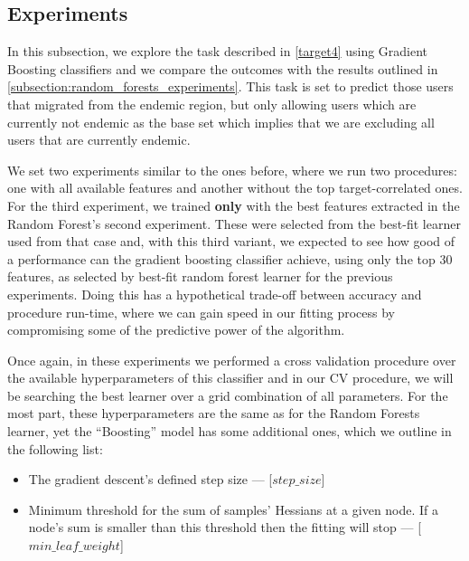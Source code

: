 \subsection{Experiments}\label{subsection:boosting_experiments}


In this subsection, we explore the task described in \cref{target4} using Gradient Boosting classifiers and we compare the outcomes with the results outlined in \cref{subsection:random_forests_experiments}.
This task is set to predict those users that migrated from the endemic region, but only allowing users which are currently not endemic as the base set which implies that we are excluding all users that are currently endemic.

We set two experiments similar to the ones before, where we run two procedures: one with all available features and another without the top target-correlated ones.
For the third experiment, we trained \textbf{only} with the best features extracted in the Random Forest's second experiment.
These were selected from the best-fit learner used from that case and, with this third variant, we expected to see how good of a performance can the gradient boosting classifier achieve, using only the top 30 features, as selected by best-fit random forest learner for the previous experiments.
Doing this has a hypothetical trade-off between accuracy and procedure run-time, where we can gain speed in our fitting process by compromising some of the predictive power of the algorithm.


Once again, in these experiments we performed a cross validation procedure over the available hyperparameters of this classifier and in our CV procedure, we will be searching the best learner over a grid combination of all parameters.
For the most part, these hyperparameters are the same as for the Random Forests learner, yet the ``Boosting'' model has some additional ones, which we outline in the following list:
\begin{itemize}
  \item The gradient descent's defined step size  --- [$step\_size$]
  \item Minimum threshold for the sum of samples' Hessians at a given node.
  If a node's sum is smaller than this threshold then the fitting will stop  --- [$min\_leaf\_weight$]
\label{list:boosting_grid_search_params}
\end{itemize}


